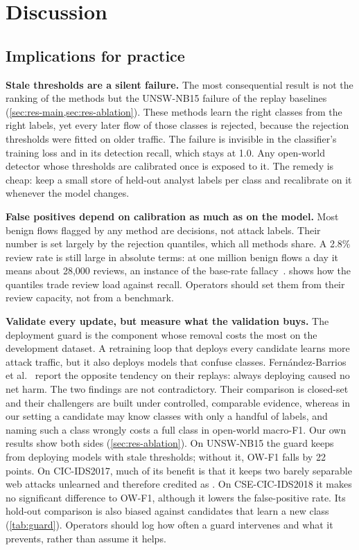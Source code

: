 \section{Discussion}
\label{sec:discussion}

\subsection{Implications for practice}
\textbf{Stale thresholds are a silent failure.} The most consequential result is not the ranking of the methods
but the UNSW-NB15 failure of the replay baselines (\cref{sec:res-main,sec:res-ablation}). These methods learn the
right classes from the right labels, yet every later flow of those classes is rejected, because the rejection
thresholds were fitted on older traffic. The failure is invisible in the classifier's training loss and in its
detection recall, which stays at 1.0. Any open-world detector whose thresholds are calibrated once is exposed to
it. The remedy is cheap: keep a small store of held-out analyst labels per class and recalibrate on it whenever
the model changes.

\textbf{False positives depend on calibration as much as on the model.} Most benign flows flagged by any method are
\unk{} decisions, not attack labels. Their number is set largely by the rejection quantiles, which all methods
share. A 2.8\% review rate is still large in absolute terms: at one million benign flows a day it means about
28{,}000 reviews, an instance of the base-rate fallacy~\cite{arp2022dos}.  shows how the
quantiles trade review load against recall. Operators should set them from their review capacity, not from a
benchmark.

\textbf{Validate every update, but measure what the validation buys.} The deployment guard is the component whose
removal costs the most on the development dataset. A retraining loop that deploys every candidate learns more
attack traffic, but it also deploys models that confuse classes. Fern{\'a}ndez-Barrios et
al.~\cite{fernandezbarrios2026candidate} report the opposite tendency on their replays: always deploying caused no
net harm. The two findings are not contradictory. Their comparison is closed-set and their challengers are built
under controlled, comparable evidence, whereas in our setting a candidate may know classes with only a handful of
labels, and naming such a class wrongly costs a full class in open-world macro-F1. Our own results show both sides
(\cref{sec:res-ablation}). On UNSW-NB15 the guard keeps \nova{} from deploying models with stale thresholds; without
it, OW-F1 falls by 22 points. On CIC-IDS2017, much of its benefit is that it keeps two barely separable web attacks
unlearned and therefore credited as \unk{}. On CSE-CIC-IDS2018 it makes no significant difference to OW-F1, although
it lowers the false-positive rate. Its hold-out comparison is also biased against candidates that learn a new class
(\cref{tab:guard}). Operators should log how often a guard intervenes and what it prevents, rather than assume it
helps.

